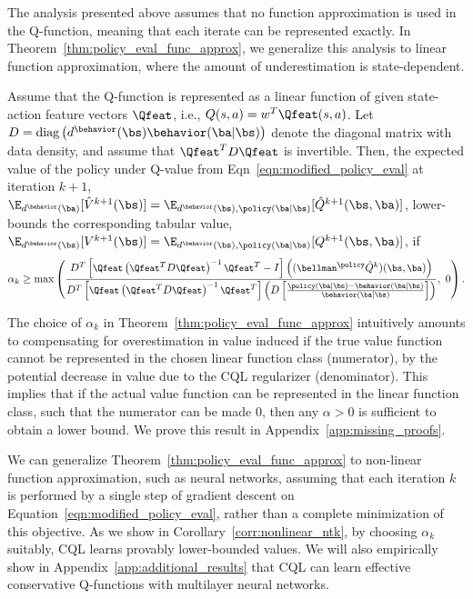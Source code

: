 The analysis presented above assumes that no function approximation is used in the Q-function, meaning that each iterate can be represented exactly.
In Theorem~\ref{thm:policy_eval_func_approx}, we generalize this analysis to linear function approximation, where the amount of underestimation is state-dependent.
\begin{theorem}
\label{thm:policy_eval_func_approx}
Assume that the Q-function is represented as a linear function of given state-action feature vectors $\Qfeat$, i.e., $Q(s, a) = w^T \Qfeat(s, a)$. Let $D = \text{diag}\left(d^\behavior(\bs) \behavior(\ba|\bs)\right)$ denote the diagonal matrix with data density, and assume that $\Qfeat^T D \Qfeat$ is invertible. Then, the expected value of the policy under Q-value from Eqn~\ref{eqn:modified_policy_eval} at iteration $k+1$, $\E_{d^\behavior(\ba)}[\hat{V}^{k+1}(\bs)] = \E_{d^\behavior(\bs), \policy(\ba|\bs)}[\hat{Q}^{k+1}(\bs, \ba)]$, lower-bounds the corresponding tabular value, $\E_{d^\behavior(\bs)}[V^{k+1}(\bs)] =\E_{d^\behavior(\bs), \policy(\ba|\bs)}[Q^{k+1}(\bs, \ba)]$, if
\begin{equation*}
\small{\alpha_k \geq \max \left(\frac{D^T\left[\Qfeat \left(\Qfeat^T D \Qfeat \right)^{-1} \Qfeat^T - I \right]\left((\bellman^\policy \hat{Q}^k)(\bs, \ba)\right)}{D^T\left[ \Qfeat \left(\Qfeat^T D \Qfeat \right)^{-1} \Qfeat^T \right] \left(D \left[\frac{\policy(\ba|\bs) - \behavior(\ba|\bs)}{\behavior(\ba|\bs)} \right] \right)},~ 0 \right).}
\end{equation*}
\end{theorem}
The choice of $\alpha_k$ in Theorem~\ref{thm:policy_eval_func_approx} intuitively amounts to compensating for overestimation in value induced if the true value function cannot be represented in the chosen linear function class (numerator), by the potential decrease in value due to the CQL regularizer (denominator). This implies that if the actual value function can be represented in the linear function class, such that the numerator can be made $0$, then any $\alpha > 0$ is sufficient to obtain a lower bound. We prove this result in Appendix~\ref{app:missing_proofs}. 

We can generalize Theorem~\ref{thm:policy_eval_func_approx} to non-linear function approximation, such as neural networks, assuming that each iteration $k$ is performed by a single step of gradient descent on Equation~\ref{eqn:modified_policy_eval}, rather than a complete minimization of this objective. As we show in Corollary~\ref{corr:nonlinear_ntk}, by choosing $\alpha_k$ suitably, CQL learns provably lower-bounded values. We will also empirically show in Appendix~\ref{app:additional_results} that CQL can learn effective conservative Q-functions with multilayer neural networks.


